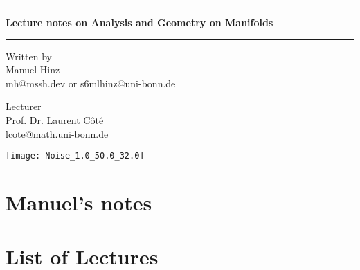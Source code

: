 \documentclass[a4paper, 10pt, oneside]{book}
\author{Manuel Hinz}
\begin{document}
\pagecolor{mycolor}
\begin{titlepage}
    \centering

    \vspace*{1cm}

    {\color{white}\rule{\textwidth}{1pt}}

    \vspace{.7\baselineskip}
    {\huge {\color{white}\textbf{Lecture notes on Analysis and Geometry on Manifolds}}}

    {\color{white}\rule{\textwidth}{1pt}}

    \vspace{1.5cm}

    \large

    \begin{minipage}{.5\textwidth}
        \color{white}
        \centering
        Written by \\
        Manuel Hinz\\
        {\normalsize mh@mssh.dev or s6mlhinz@uni-bonn.de}
    \end{minipage}%
    \begin{minipage}{.5\textwidth}
        \color{white}
        \centering
        Lecturer\\
        Prof. Dr. Laurent Côté  \\
        {\normalsize lcote@math.uni-bonn.de}
    \end{minipage}


    \vspace{3cm}

    \texttt{[image: Noise\_1.0\_50.0\_32.0]}

    \vfill

    \color{white}{
    University of Bonn \\
    Winter semester 2024/2025\\
    Last update: \today
    }
   
\end{titlepage}
\pagecolor{white}
\tableofcontents

\restoregeometry
\setcounter{chapter}{-1}
\chapter{Manuel's notes}




\chapter*{List of Lectures}
\begin{itemize}
    \renewcommand*{\do}[1]{\item \hyperlink{#1}{Lecture \StrBehind{#1}{c}:} }
    \dolistloop{\lecturelist}
\end{itemize}
\end{document}
